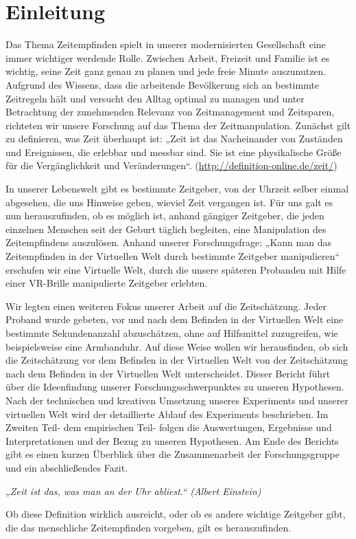 \documentclass{Bericht}
\begin{document}
\maketitle


\tableofcontents
\clearpage

\section{Einleitung}
	Das Thema Zeitempfinden spielt in unserer modernisierten Gesellschaft eine immer wichtiger werdende Rolle. Zwischen Arbeit, Freizeit und Familie ist es wichtig, seine Zeit ganz genau zu planen und jede freie Minute auszunutzen. Aufgrund des Wissens, dass die arbeitende Bevölkerung sich an bestimmte Zeitregeln hält und versucht den Alltag optimal zu managen und unter Betrachtung der zunehmenden Relevanz von Zeitmanagement und Zeitsparen, richteten wir unsere Forschung auf das Thema der Zeitmanpulation. Zunächst gilt zu definieren, was Zeit überhaupt ist: „Zeit ist das Nacheinander von Zuständen und Ereignissen, die erlebbar und messbar sind. Sie ist eine physikalische Größe für die Vergänglichkeit und Veränderungen“. (\underline{http://definition-online.de/zeit/})
	\par
	In unserer Lebenswelt gibt es bestimmte Zeitgeber, von der Uhrzeit selber einmal abgesehen, die uns Hinweise geben, wieviel Zeit vergangen ist. Für uns galt es nun herauszufinden, ob es möglich ist, anhand gängiger Zeitgeber, die jeden einzelnen Menschen seit der Geburt täglich begleiten, eine Manipulation des Zeitempfindens auszulösen. Anhand unserer Forschungsfrage: „Kann man das Zeitempfinden in der Virtuellen Welt durch bestimmte Zeitgeber manipulieren“ erschufen wir eine Virtuelle Welt, durch die unsere späteren Probanden mit Hilfe einer VR-Brille manipulierte Zeitgeber erlebten. 
	\par
	 Wir legten einen weiteren Fokus unserer Arbeit auf die Zeitschätzung. Jeder Proband wurde gebeten, vor und nach dem Befinden in der Virtuellen Welt eine bestimmte Sekundenanzahl abzuschätzen, ohne auf Hilfsmittel zuzugreifen, wie beispielsweise eine Armbanduhr. Auf diese Weise wollen wir herausfinden, ob sich die Zeitschätzung vor dem Befinden in der Virtuellen Welt von der Zeitschätzung nach dem Befinden in der Virtuellen Welt unterscheidet.
Dieser Bericht führt über die Ideenfindung unserer Forschungsschwerpunktes zu unseren Hypothesen. Nach der technischen und kreativen Umsetzung unseres Experiments und unserer virtuellen Welt wird der detaillierte Ablauf des Experiments beschrieben. Im Zweiten Teil- dem empirischen Teil- folgen die Auswertungen, Ergebnisse und Interpretationen und der Bezug zu unseren Hypothesen. Am Ende des Berichts gibt es einen kurzen Überblick über die Zusammenarbeit der Forschungsgruppe und ein abschließendes Fazit. 
	\par
	\textit{„Zeit ist das, was man an der Uhr abliest.“ (Albert Einstein)}
	\par
	Ob diese Definition wirklich ausreicht, oder ob es andere wichtige Zeitgeber gibt, die das menschliche Zeitempfinden vorgeben, gilt es herauszufinden. 
\end{document}

